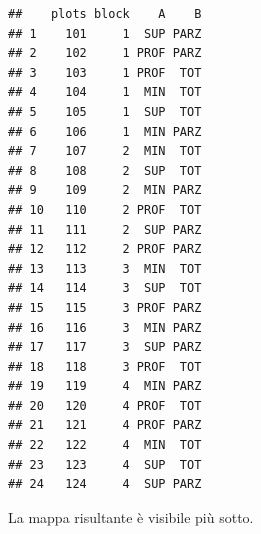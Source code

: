\documentclass[a4paper,12pt,oneside]{book}
\newenvironment{Shaded}{\begin{snugshade}}{\end{snugshade}}
\newcommand{\KeywordTok}[1]{\textcolor[rgb]{0.13,0.29,0.53}{\textbf{#1}}}
\newcommand{\DataTypeTok}[1]{\textcolor[rgb]{0.13,0.29,0.53}{#1}}
\newcommand{\DecValTok}[1]{\textcolor[rgb]{0.00,0.00,0.81}{#1}}
\newcommand{\StringTok}[1]{\textcolor[rgb]{0.31,0.60,0.02}{#1}}
\newcommand{\CommentTok}[1]{\textcolor[rgb]{0.56,0.35,0.01}{\textit{#1}}}
\newcommand{\OperatorTok}[1]{\textcolor[rgb]{0.81,0.36,0.00}{\textbf{#1}}}
\newcommand{\NormalTok}[1]{#1}
\begin{document}
\begin{Shaded}
\end{Shaded}

\begin{verbatim}
##    plots block    A    B
## 1    101     1  SUP PARZ
## 2    102     1 PROF PARZ
## 3    103     1 PROF  TOT
## 4    104     1  MIN  TOT
## 5    105     1  SUP  TOT
## 6    106     1  MIN PARZ
## 7    107     2  MIN  TOT
## 8    108     2  SUP  TOT
## 9    109     2  MIN PARZ
## 10   110     2 PROF  TOT
## 11   111     2  SUP PARZ
## 12   112     2 PROF PARZ
## 13   113     3  MIN  TOT
## 14   114     3  SUP  TOT
## 15   115     3 PROF PARZ
## 16   116     3  MIN PARZ
## 17   117     3  SUP PARZ
## 18   118     3 PROF  TOT
## 19   119     4  MIN PARZ
## 20   120     4 PROF  TOT
## 21   121     4 PROF PARZ
## 22   122     4  MIN  TOT
## 23   123     4  SUP  TOT
## 24   124     4  SUP PARZ
\end{verbatim}

La mappa risultante è visibile più sotto.
\end{document}
